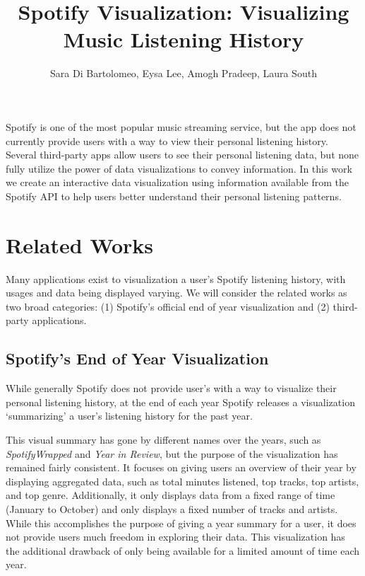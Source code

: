 \documentclass[journal]{vgtc}                %
\title{Spotify Visualization: Visualizing Music Listening History}
\author{Sara Di Bartolomeo, Eysa Lee, Amogh Pradeep, Laura South}
\begin{document}


\maketitle

Spotify is one of the most popular music streaming service, but the app does not currently provide users with a way to view their personal listening history. Several third-party apps allow users to see their personal listening data, but none fully utilize the power of data visualizations to convey information. In this work we create an interactive data visualization using information available from the Spotify API to help users better understand their personal listening patterns.

\section{Related Works}
Many applications exist to visualization a user's Spotify listening history, with usages and data being displayed varying. We will consider the related works as two broad categories: (1) Spotify's official end of year visualization and (2) third-party applications.

\subsection{Spotify's End of Year Visualization}

While generally Spotify does not provide user's with a way to visualize their personal listening history, at the end of each year Spotify releases a visualization `summarizing' a user's listening history for the past year\cite{Spo18}.

This visual summary has gone by different names over the years, such as \emph{SpotifyWrapped} and \emph{Year in Review}, but the purpose of the visualization has remained fairly consistent. It focuses on giving users an overview of their year by displaying aggregated data, such as total minutes listened, top tracks, top artists, and top genre. Additionally, it only displays data from a fixed range of time (January to October) and only displays a fixed number of tracks and artists. While this accomplishes the purpose of giving a year summary for a user, it does not provide users much freedom in exploring their data. This visualization has the additional drawback of only being available for a limited amount of time each year.
\end{document}
